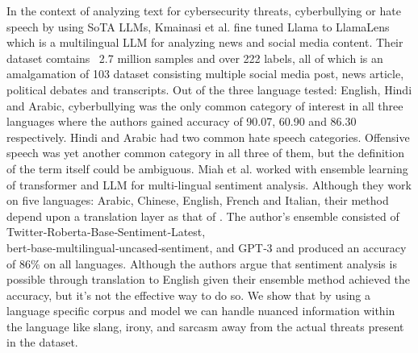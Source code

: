 In the context of analyzing text for cybersecurity threats, cyberbullying or hate speech by using SoTA LLMs, Kmainasi et al. \cite{llm_content_analysis} fine tuned Llama to LlamaLens which is a multilingual LLM for analyzing news and social media content. Their dataset comtains ~2.7 million samples and over 222 labels, all of which is an amalgamation of 103 dataset consisting multiple social media post, news article, political debates and transcripts. Out of the three language tested: English, Hindi and Arabic, cyberbullying was the only common category of interest in all three languages where the authors gained accuracy of 90.07, 60.90 and 86.30 respectively. Hindi and Arabic had two common hate speech categories. Offensive speech was yet another common category in all three of them, but the definition of the term itself could be ambiguous.  Miah et al. \cite{sentiment_multilingual} worked with ensemble learning of transformer and LLM for multi-lingual sentiment analysis. Although they work on five languages: Arabic, Chinese, English, French and Italian, their method depend upon a translation layer as that of \cite{english-urdu,berlin_bomb}. The author's ensemble consisted of Twitter‑Roberta‑Base‑Sentiment‑Latest, bert‑base‑multilingual‑uncased‑sentiment, and GPT‑3 and produced an accuracy of 86\% on all languages. Although the authors argue that sentiment analysis is possible through translation to English given their ensemble method achieved the accuracy, but it's not the effective way to do so. We show that by using a language specific corpus and model we can handle nuanced information within the language like slang, irony, and sarcasm away from the actual threats present in the dataset.


